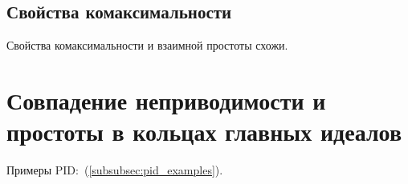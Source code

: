 \documentclass[a4paper]{report}
\begin{document}
    \subsection{Свойства комаксимальности}
    Свойства комаксимальности и взаимной простоты схожи.


    \section{Совпадение неприводимости и простоты в кольцах главных идеалов}
    Примеры PID:~(\ref{subsubsec:pid_examples}).
\end{document}
